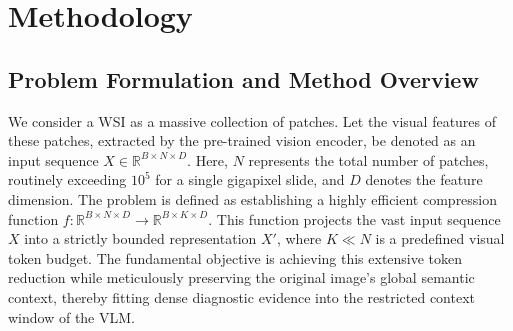 \documentclass[runningheads]{llncs}
\begin{document}




\section{Methodology}
\label{sec:methodology}

\subsection{Problem Formulation and Method Overview}


We consider a WSI as a massive collection of patches. Let the visual features of these patches, extracted by the pre-trained vision encoder, be denoted as an input sequence $X \in \mathbb{R}^{B\times N \times D}$. Here, $N$ represents the total number of patches, routinely exceeding $10^5$ for a single gigapixel slide, and $D$ denotes the feature dimension. The problem is defined as establishing a highly efficient compression function $f: \mathbb{R}^{B \times N \times D} \rightarrow \mathbb{R}^{B \times K \times D}$. This function projects the vast input sequence $X$ into a strictly bounded representation $X'$, where $K \ll N$ is a predefined visual token budget. The fundamental objective is achieving this extensive token reduction while meticulously preserving the original image's global semantic context, thereby fitting dense diagnostic evidence into the restricted context window of the VLM.
\end{document}
